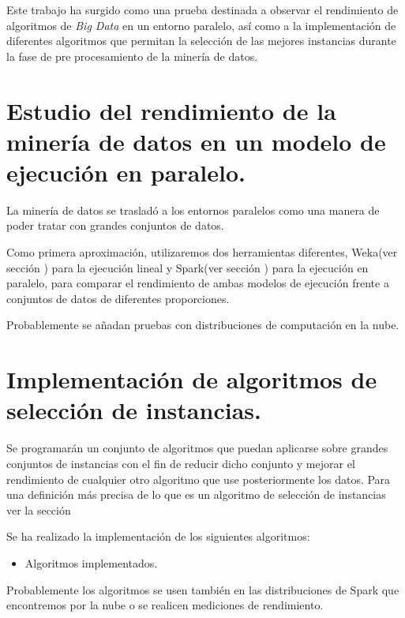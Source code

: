 


Este trabajo ha surgido como una prueba destinada a observar el rendimiento de algoritmos de \textit{Big Data} en un entorno paralelo, así como a la implementación de diferentes algoritmos que permitan la selección de las mejores instancias durante la fase de pre procesamiento de la minería de datos.

\section{Estudio del rendimiento de la minería de datos en un modelo de ejecución en paralelo.}

La minería de datos se trasladó a los entornos paralelos como una manera de poder tratar con grandes conjuntos de datos.

Como primera aproximación, utilizaremos dos herramientas diferentes, Weka(ver sección ) para la ejecución lineal y Spark(ver sección ) para la ejecución en paralelo, para comparar el rendimiento de ambas modelos de ejecución frente a conjuntos de datos de diferentes proporciones.

Probablemente se añadan pruebas con distribuciones de computación en la nube.

\section{Implementación de algoritmos de selección de instancias.}

Se programarán un conjunto de algoritmos que puedan aplicarse sobre grandes conjuntos de instancias con el fin de reducir dicho conjunto y mejorar el rendimiento de cualquier otro algoritmo que use posteriormente los datos. Para una definición más precisa de lo que es un algoritmo de selección de instancias ver la sección 

Se ha realizado la implementación de los siguientes algoritmos:

\begin{itemize}
	\item Algoritmos implementados.
\end{itemize}

Probablemente los algoritmos se usen también en las distribuciones de Spark que encontremos por la nube o se realicen mediciones de rendimiento.